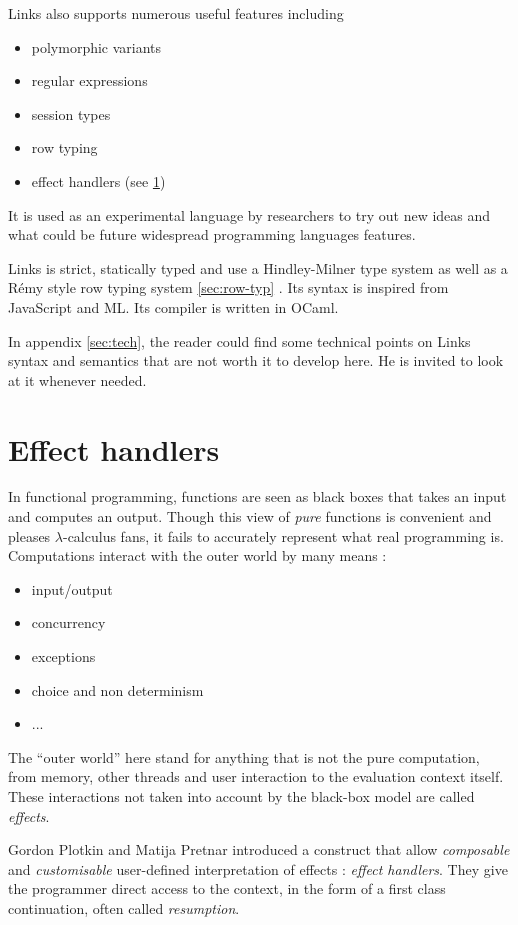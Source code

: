 \documentclass[11pt, nonacm=true, language=french, language=english]{acmart}
\begin{document}
Links also supports numerous useful features including
\begin{itemize}
  \item polymorphic variants
  \item regular expressions
  \item session types
  \item row typing
  \item effect handlers (see \ref{sec:handlers})
\end{itemize}
It is used as an experimental language by researchers to try out new ideas and what could be future widespread programming languages features.

Links is strict, statically typed and use a Hindley-Milner type system as well as a Rémy style row typing system \ref{sec:row-typ} \citep{row-typ}. Its syntax is inspired from JavaScript and ML. Its compiler \citep{gh:links} is written in OCaml.

\begin{rem}
  In appendix \ref{sec:tech}, the reader could find some technical points on Links syntax and semantics that are not worth it to develop here. He is invited to look at it whenever needed.
\end{rem}

\section{Effect handlers}
\label{sec:handlers}

In functional programming, functions are seen as black boxes that takes an input and computes an output. Though this view of \emph{pure} functions is convenient and pleases $\lambda$-calculus fans, it fails to accurately represent what real programming is. Computations interact with the outer world by many means :
\begin{itemize}
  \item input/output
  \item concurrency
  \item exceptions
  \item choice and non determinism
  \item ...
\end{itemize}
The ``outer world'' here stand for anything that is not the pure computation, from memory, other threads and user interaction to the evaluation context itself.
These interactions not taken into account by the black-box model are called \emph{effects}.

Gordon Plotkin and Matija Pretnar \citep{plotkin-pretnar} introduced a construct that allow \emph{composable} and \emph{customisable} user-defined interpretation of effects : \emph{effect handlers}. They give the programmer direct access to the context, in the form of a first class continuation, often called \emph{resumption}.
\end{document}
